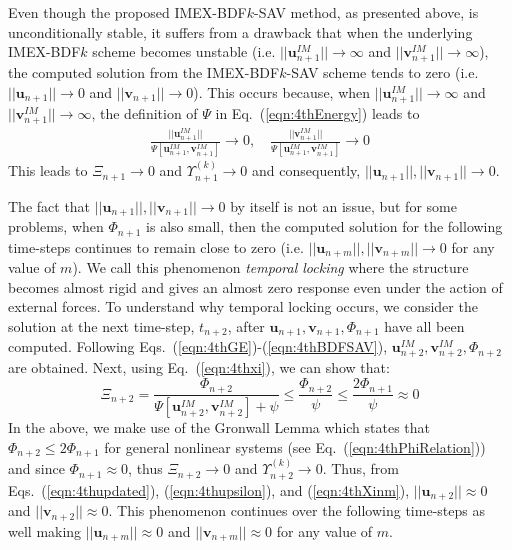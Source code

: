 \documentclass[review]{elsarticle}
\begin{document}
Even though the proposed IMEX-BDF$k$-SAV method, as presented above, is unconditionally stable, it suffers from a drawback that when the underlying IMEX-BDF$k$ scheme becomes unstable (i.e. $||\boldsymbol{u}_{n+1}^{IM}|| \rightarrow \infty$ and $||\boldsymbol{v}_{n+1}^{IM}|| \rightarrow \infty$), the computed solution from the IMEX-BDF$k$-SAV scheme tends to zero (i.e. $||\boldsymbol{u}_{n+1}|| \rightarrow 0$ and $||\boldsymbol{v}_{n+1}|| \rightarrow 0$).
This occurs because, when $||\boldsymbol{u}_{n+1}^{IM}|| \rightarrow \infty$ and $||\boldsymbol{v}_{n+1}^{IM}|| \rightarrow \infty$, the definition of $\Psi$ in Eq.~(\ref{eqn:4thEnergy}) leads to
\begin{align}
    \frac{||\boldsymbol{u}_{n+1}^{IM}||}{\Psi[\boldsymbol{u}_{n+1}^{IM},\boldsymbol{v}_{n+1}^{IM}]} \rightarrow 0, \quad
    \frac{||\boldsymbol{v}_{n+1}^{IM}||}{\Psi[\boldsymbol{u}_{n+1}^{IM},\boldsymbol{v}_{n+1}^{IM}]} \rightarrow 0 \label{eqn:4thUV_Phi}
\end{align}
This leads to $\Xi_{n+1}\rightarrow 0 $ and $\Upsilon_{n+1}^{(k)}\rightarrow 0$ and consequently, $||\boldsymbol{u}_{n+1}||, ||\boldsymbol{v}_{n+1}|| \rightarrow 0$.

The fact that $||\boldsymbol{u}_{n+1}||, ||\boldsymbol{v}_{n+1}|| \rightarrow 0$ by itself is not an issue, but for some problems, when $\Phi_{n+1}$ is also small, then the computed solution for the following time-steps continues to remain close to zero (i.e. $||\boldsymbol{u}_{n+m}||, ||\boldsymbol{v}_{n+m}|| \rightarrow 0$ for any value of $m$).
We call this phenomenon \emph{temporal locking} where the structure becomes almost rigid and gives an almost zero response even under the action of external forces.  
To understand why temporal locking occurs, we consider the solution at the next time-step, $t_{n+2}$, after $\boldsymbol{u}_{n+1},\boldsymbol{v}_{n+1},\Phi_{n+1}$ have all been computed.
Following Eqs.~(\ref{eqn:4thGE})-(\ref{eqn:4thBDFSAV}), $\boldsymbol{u}^{IM}_{n+2}, \boldsymbol{v}^{IM}_{n+2}, \Phi_{n+2}$ are obtained.
Next, using Eq.~(\ref{eqn:4thxi}), we can show that: 
\begin{equation}
    \Xi_{n+2} = \frac{\Phi_{n+2}}{\Psi[\boldsymbol{u}_{n+2}^{IM},\boldsymbol{v}_{n+2}^{IM}]+\psi} \le \frac{\Phi_{n+2}}{\psi} \le \frac{2\Phi_{n+1}}{\psi} \approx 0
    \label{eqn:4thXinm}
\end{equation}
In the above, we make use of the Gronwall Lemma which states that $\Phi_{n+2} \le 2 \Phi_{n+1}$ for general nonlinear systems (see Eq.~(\ref{eqn:4thPhiRelation})) and since $\Phi_{n+1} \approx 0$, thus $\Xi_{n+2} \rightarrow 0$ and $\Upsilon_{n+2}^{(k)}\rightarrow 0$.
Thus, from Eqs.~(\ref{eqn:4thupdated}), (\ref{eqn:4thupsilon}), and (\ref{eqn:4thXinm}), $||\boldsymbol{u}_{n+2}|| \approx 0$ and $||\boldsymbol{v}_{n+2}|| \approx 0$.
This phenomenon continues over the following time-steps as well making $||\boldsymbol{u}_{n+m}|| \approx 0$ and $||\boldsymbol{v}_{n+m}|| \approx 0$ for any value of $m$.
\end{document}
